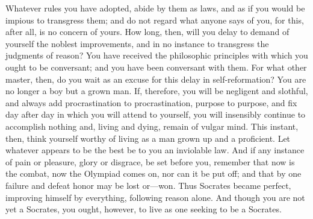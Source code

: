 Whatever rules you have adopted, abide by them  as laws, and as if you would be
impious to  transgress them;  and do not  regard what anyone  says of  you, for
this, after  all, is no  concern of  yours. How long,  then, will you  delay to
demand of yourself  the noblest improvements, and in no  instance to transgress
the  judgments of  reason? You  have received  the philosophic  principles with
which you ought to  be conversant; and you have been  conversant with them. For
what  other  master,  then,  do  you  wait as  an  excuse  for  this  delay  in
self-reformation?  You are  no longer  a boy  but a  grown man.  If, therefore,
you  will  be  negligent  and  slothful,  and  always  add  procrastination  to
procrastination, purpose  to purpose, and fix  day after day in  which you will
attend to  yourself, you  will insensibly continue  to accomplish  nothing and,
living and  dying, remain of  vulgar mind.  This instant, then,  think yourself
worthy of living as a man grown up and a proficient. Let whatever appears to be
the best be to you an inviolable law.  And if any instance of pain or pleasure,
glory or disgrace, be set before you,  remember that now is the combat, now the
Olympiad comes on,  nor can it be put  off; and that by one  failure and defeat
honor may be lost or---won. Thus  Socrates became perfect, improving himself by
everything, following reason alone. And though  you are not yet a Socrates, you
ought, however, to live as one seeking to be a Socrates.
